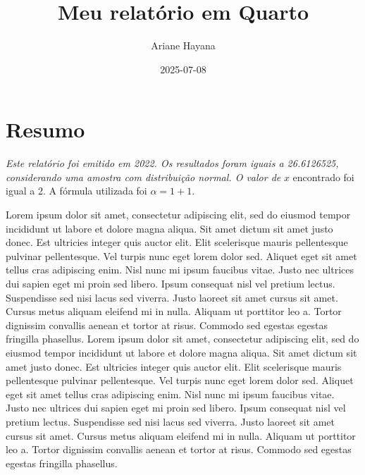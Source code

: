 \documentclass[
  a4paper,
]{report}
\title{Meu relatório em Quarto}
\author{Ariane Hayana}
\date{2025-07-08}
\renewcommand*\contentsname{Índice}
\newcommand\contentsname{Índice}
\begin{document}
\maketitle
\ifdefined\Shaded\renewenvironment{Shaded}{\begin{tcolorbox}[frame hidden, interior hidden, enhanced, breakable, boxrule=0pt, sharp corners, borderline west={3pt}{0pt}{shadecolor}]}{\end{tcolorbox}}\fi

\renewcommand*\contentsname{Índice}
{
\hypersetup{linkcolor=}
\setcounter{tocdepth}{2}
\tableofcontents
}
\listoffigures
\listoftables
\hypertarget{resumo}{%
\chapter*{Resumo}\label{resumo}}

\emph{Este relatório foi emitido em 2022. Os resultados foram iguais a
26.6126525, considerando uma amostra com distribuição normal. O valor
de} \(x\) encontrado foi igual a 2. A fórmula utilizada foi
\(\alpha = 1+1\).

Lorem ipsum dolor sit amet, consectetur adipiscing elit, sed do eiusmod
tempor incididunt ut labore et dolore magna aliqua. Sit amet dictum sit
amet justo donec. Est ultricies integer quis auctor elit. Elit
scelerisque mauris pellentesque pulvinar pellentesque. Vel turpis nunc
eget lorem dolor sed. Aliquet eget sit amet tellus cras adipiscing enim.
Nisl nunc mi ipsum faucibus vitae. Justo nec ultrices dui sapien eget mi
proin sed libero. Ipsum consequat nisl vel pretium lectus. Suspendisse
sed nisi lacus sed viverra. Justo laoreet sit amet cursus sit amet.
Cursus metus aliquam eleifend mi in nulla. Aliquam ut porttitor leo a.
Tortor dignissim convallis aenean et tortor at risus. Commodo sed
egestas egestas fringilla phasellus. Lorem ipsum dolor sit amet,
consectetur adipiscing elit, sed do eiusmod tempor incididunt ut labore
et dolore magna aliqua. Sit amet dictum sit amet justo donec. Est
ultricies integer quis auctor elit. Elit scelerisque mauris pellentesque
pulvinar pellentesque. Vel turpis nunc eget lorem dolor sed. Aliquet
eget sit amet tellus cras adipiscing enim. Nisl nunc mi ipsum faucibus
vitae. Justo nec ultrices dui sapien eget mi proin sed libero. Ipsum
consequat nisl vel pretium lectus. Suspendisse sed nisi lacus sed
viverra. Justo laoreet sit amet cursus sit amet. Cursus metus aliquam
eleifend mi in nulla. Aliquam ut porttitor leo a. Tortor dignissim
convallis aenean et tortor at risus. Commodo sed egestas egestas
fringilla phasellus.
\end{document}
